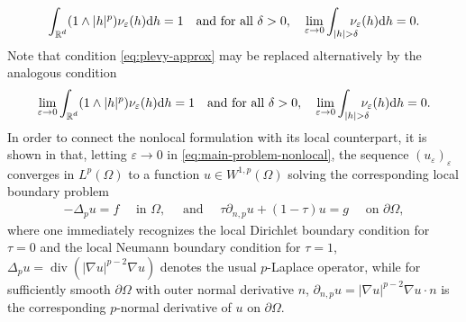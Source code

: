 \documentclass[12pt, reqno]{amsart}%
\theoremstyle{plain}  %
\theoremstyle{definition}  %
\numberwithin{equation}{section}
\DeclareMathOperator{\R}{\mathbb{R}}
\renewcommand{\d}{\mathrm{d}}
\newcommand{\eps}{\varepsilon}
\begin{document}
\begin{align}\label{eq:plevy-approx}
\int_{\R^d}(1\land|h|^p) \nu_\eps (h)\d h=1\quad\text{and for all $\delta>0,$}\quad \lim_{\eps\to0} \int_{|h|>\delta} \hspace{-2ex}\nu_\eps (h)\d h=0.
\end{align}
Note that condition \eqref{eq:plevy-approx} may be replaced alternatively by the analogous condition
 \begin{align}\label{eq:plevy-approx-bis}
\lim_{\eps\to0}\int_{\R^d}(1\land|h|^p) \nu_\eps (h)\d h=1\quad\text{and for all $\delta>0,$}\quad \lim_{\eps\to0} \int_{|h|>\delta}\hspace{-2ex} \nu_\eps (h)\d h=0.
\end{align}
In order to connect the nonlocal formulation with its local counterpart, it is shown in \cite{Fog25} that, letting $\eps \to 0$ in \eqref{eq:main-problem-nonlocal}, the sequence $(u_\eps)_\eps$ converges in $L^p(\Omega)$ to a function $u\in W^{1,p}(\Omega)$ solving the corresponding local boundary problem
\begin{align}\tag{$P_\tau$}
\label{eq:main-problem-local}
-\Delta_p u = f \quad \text{ in } \Omega, \quad\text{ and }\quad
\tau  \partial_{n,p} u + (1-\tau) u = g \quad \text{ on } \partial\Omega,
\end{align}
 where one immediately recognizes the local Dirichlet boundary condition for $\tau = 0$ and the local Neumann boundary condition for $\tau = 1$, $\Delta_p u =\operatorname{div}(|\nabla u|^{p-2}\nabla u)$ denotes the usual $p$-Laplace operator, while for sufficiently smooth $\partial \Omega$ with outer normal derivative $n$, $\partial_{n,p} u= |\nabla u|^{p-2}\nabla u\cdot n$ is the corresponding $p$-normal derivative of $u$ on $\partial \Omega$.
\end{document}
